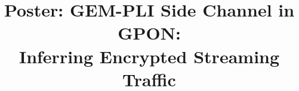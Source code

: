 \documentclass[conference]{IEEEtran}
\begin{document}
%
\title{Poster: GEM-PLI Side Channel in GPON: \\Inferring Encrypted Streaming Traffic}


\author{
	}
	

% 






\end{document}
